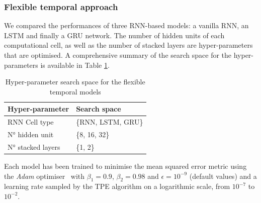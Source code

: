 \subsubsection{Flexible temporal approach}
We compared the performances of three RNN-based models: a vanilla RNN, an LSTM and finally a GRU network. The number of hidden units of each computational cell, as well as the number of stacked layers are hyper-parameters that are optimised. A comprehensive summary of the search space for the hyper-parameters is available in Table \ref{tab:rnn_search_space}. 

\begin{table}
    \centering
    \caption{Hyper-parameter search space for the flexible temporal models}
    \begin{tabular}{ll}
    \toprule
    \textbf{Hyper-parameter} & \textbf{Search space} \\ 
    \midrule
    RNN Cell type & \{RNN, LSTM, GRU\} \\
    N° hidden unit & \{8, 16, 32\} \\
    N° stacked layers & \{1, 2\} \\
    \bottomrule
    \end{tabular}
    \label{tab:rnn_search_space}
\end{table}
Each model has been trained to minimise the mean squared error metric using the  \textit{Adam} optimiser~\citep{kingma2014adam} with $\beta_{1} = 0.9$, $\beta_{2} = 0.98$ and $\epsilon = 10^{-9}$ (default values) and a learning rate sampled by the TPE algorithm on a logarithmic scale,  from $10^{-7}$ to $10^{-2}$. 

